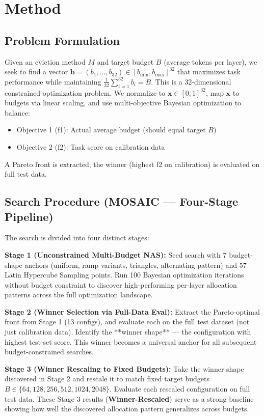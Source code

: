 \documentclass[11pt]{article}
\begin{document}
\section{Method}

\subsection{Problem Formulation}

Given an eviction method $M$ and target budget $B$ (average tokens per layer), we seek to find a vector $\mathbf{b} = (b_1, \ldots, b_{32}) \in [b_{\min}, b_{\max}]^{32}$ that maximizes task performance while maintaining $\frac{1}{32}\sum_{i=1}^{32} b_i = B$. This is a 32-dimensional constrained optimization problem. We normalize to $\mathbf{x} \in [0,1]^{32}$, map $\mathbf{x}$ to budgets via linear scaling, and use multi-objective Bayesian optimization to balance:
\begin{itemize}
\item Objective 1 (f1): Actual average budget (should equal target $B$)
\item Objective 2 (f2): Task score on calibration data
\end{itemize}

A Pareto front is extracted; the winner (highest f2 on calibration) is evaluated on full test data.

\subsection{Search Procedure (MOSAIC — Four-Stage Pipeline)}

The search is divided into four distinct stages:

\textbf{Stage 1 (Unconstrained Multi-Budget NAS):} Seed search with 7 budget-shape anchors (uniform, ramp variants, triangles, alternating pattern) and 57 Latin Hypercube Sampling points. Run 100 Bayesian optimization iterations without budget constraint to discover high-performing per-layer allocation patterns across the full optimization landscape.

\textbf{Stage 2 (Winner Selection via Full-Data Eval):} Extract the Pareto-optimal front from Stage 1 (13 configs), and evaluate each on the full test dataset (not just calibration data). Identify the **winner shape** — the configuration with highest test-set score. This winner becomes a universal anchor for all subsequent budget-constrained searches.

\textbf{Stage 3 (Winner Rescaling to Fixed Budgets):} Take the winner shape discovered in Stage 2 and rescale it to match fixed target budgets $B \in \{64, 128, 256, 512, 1024, 2048\}$. Evaluate each rescaled configuration on full test data. These Stage 3 results (\textbf{Winner-Rescaled}) serve as a strong baseline showing how well the discovered allocation pattern generalizes across budgets.
\end{document}
